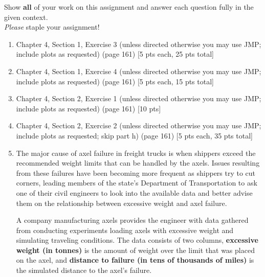\documentclass[11pt]{article}\usepackage[]{graphicx}\usepackage[]{color}
\begin{document}

\pagestyle{fancy} 

Show \textbf{all} of your work on this assignment and answer each question fully in the given context. \\


\emph{Please} staple your assignment!

\begin{enumerate}
	
	\item Chapter 4, Section 1, Exercise 3  (unless directed otherwise you may use JMP; include plots as requested) (page 161) [5 pts each, 25 pts total]
	
	\item Chapter 4, Section 1, Exercise 4  (unless directed otherwise you may use JMP; include plots as requested) (page 161) [5 pts each, 15 pts total]	
	
	\item Chapter 4, Section 2, Exercise 1  (unless directed otherwise you may use JMP; include plots as requested) (page 161) [10 pts]
	
	\item Chapter 4, Section 2, Exercise 2  (unless directed otherwise you may use JMP; include plots as requested; skip part h) (page 161) [5 pts each, 35 pts total]
	



\item
The major cause of axel failure in freight trucks is when shippers exceed the recommended weight limits that can be handled by the axels. 
Issues resulting from these failures have been becoming more frequent as shippers try to cut corners, 
leading members of the state's Department of Transportation to ask one of their civil engineers 
to look into the available data and better advise them on the relationship between excessive weight and axel failure.

A company manufacturing axels provides the engineer with data gathered from conducting experiments loading axels with excessive weight and simulating traveling conditions.
The data consists of two columns, \textbf{excessive weight (in tonnes)} is the amount of weight over the limit that was placed on the axel, and 
\textbf{distance to failure (in tens of thousands of miles)} is the simulated distance to the axel's failure. 


\begin{center}
\end{center}


\end{enumerate}
\end{document}
